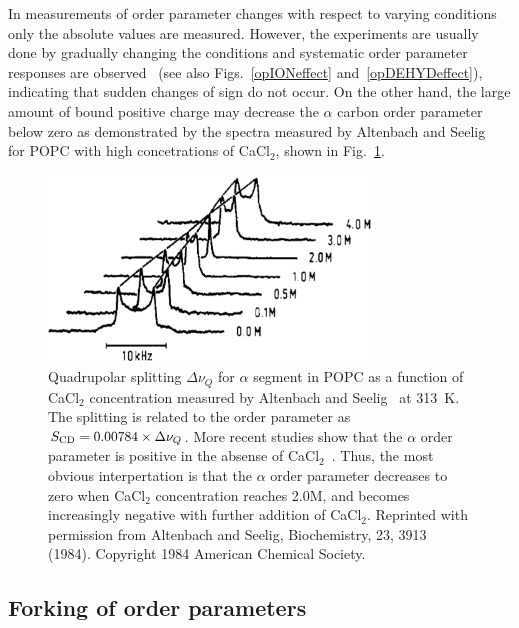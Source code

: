 \documentclass[aps,prl,superscriptaddress,twocolumn]{revtex4}
\begin{document}
In measurements of order parameter changes with respect to varying 
conditions~\cite{seelig74,seelig77,bechinger91,ulrich94,mallikarjunaiah11,dvinskikh05a,akutsu81,altenbach84,seelig87,scherer89,brown78,douliez95,ferreira13,leftin14,kuchinka89,roux90,leftin13} 
only the absolute values are measured. However, the experiments are usually done by gradually changing the conditions and systematic 
order parameter responses are observed~\cite{akutsu81,altenbach84,bechinger91,ulrich94,dvinskikh05b,mallikarjunaiah11,ferreira13} 
(see also Figs.~\ref{opIONeffect} and~\ref{opDEHYDeffect}), indicating that sudden changes of sign do not occur. 
On the other hand, the large amount of bound positive charge may decrease the $\alpha$ carbon order parameter below zero as demonstrated by the spectra measured by Altenbach and Seelig~\cite{altenbach84} for POPC with high concetrations of CaCl$_2$,
shown in Fig.~\ref{qsCACLeffect}.
\begin{figure}[]
  \includegraphics[width=8.6cm]{../Fig/QUADsplitCACLeffect.eps}
\newline
  \caption{\label{qsCACLeffect}
    Quadrupolar splitting $\Delta \nu_Q$ for $\alpha$ segment in POPC as a function of CaCl$_2$ concentration measured by Altenbach and Seelig~\cite{altenbach84} at 313~K.
    The splitting is related to the order parameter as $S_{{\rm CD}}=0.00784 \times \Delta \nu_Q$. 
    More recent studies show that the $\alpha$ order parameter is positive in the absense of CaCl$_2$~\cite{hong95a,hong95b,gross97}.
    Thus, the most obvious interpertation is that the $\alpha$ order parameter decreases to zero when CaCl$_2$ concentration reaches 2.0M, and 
    becomes increasingly negative with further addition of CaCl$_2$. Reprinted with permission from Altenbach and Seelig, Biochemistry, 23, 3913 (1984). Copyright 1984 American Chemical Society.    
  } 
\end{figure}



\subsection{Forking of order parameters}
\end{document}
